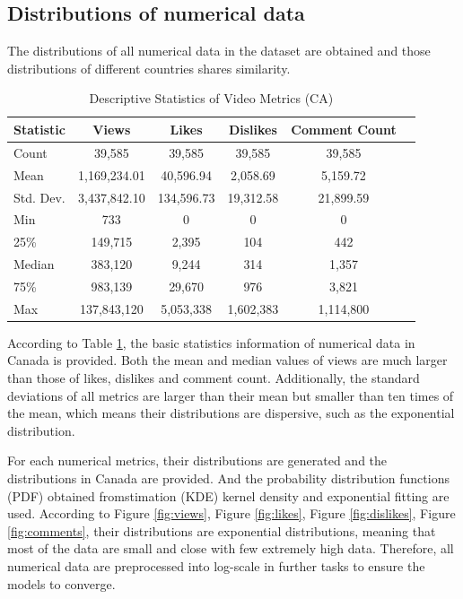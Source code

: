 \documentclass[sigplan,screen]{acmart}
\begin{document}
\subsection{Distributions of numerical data}
The distributions of all numerical data in the dataset are obtained and those distributions of different countries shares similarity. 
\begin{table}[ht]
  \centering
  \caption{Descriptive Statistics of Video Metrics (CA)}
  \label{tab:video_metrics}
  \begin{tabular}{lccccc}
  \toprule
  \textbf{Statistic} & \textbf{Views} & \textbf{Likes} & \textbf{Dislikes} & \textbf{Comment Count} \\
  \midrule
  Count & 39,585 & 39,585 & 39,585 & 39,585 \\
  Mean & 1,169,234.01 & 40,596.94 & 2,058.69 & 5,159.72 \\
  Std. Dev. & 3,437,842.10 & 134,596.73 & 19,312.58 & 21,899.59 \\
  Min & 733 & 0 & 0 & 0 \\
  25\% & 149,715 & 2,395 & 104 & 442 \\
  Median & 383,120 & 9,244 & 314 & 1,357 \\
  75\% & 983,139 & 29,670 & 976 & 3,821 \\
  Max & 137,843,120 & 5,053,338 & 1,602,383 & 1,114,800 \\
  \bottomrule
  
  \end{tabular}
  \end{table}

According to Table \ref{tab:video_metrics}, the basic statistics information of numerical data in Canada is provided. Both the mean and median values of views are much larger than those of likes, dislikes and comment count. Additionally, the standard deviations of all metrics are larger than their mean but smaller than ten times of the mean, which means their distributions are dispersive, such as the exponential distribution.

For each numerical metrics, their distributions are generated and the distributions in Canada are provided. And the probability distribution functions (PDF) obtained fromstimation (KDE) kernel density and exponential fitting are used. According to Figure \ref{fig:views}, Figure \ref{fig:likes}, Figure \ref{fig:dislikes}, Figure \ref{fig:comments}, their distributions are exponential distributions, meaning that most of the data are small and close with few extremely high data. Therefore, all numerical data are preprocessed into log-scale in further tasks to ensure the models to converge.
\end{document}
